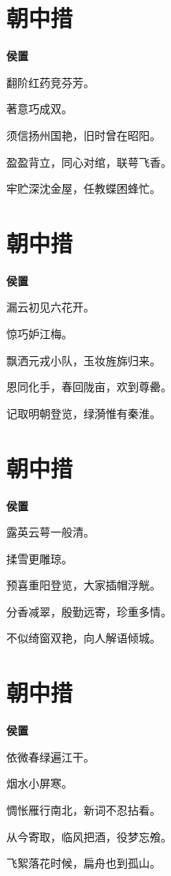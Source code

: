 \documentclass[12pt,a4paper]{ctexbook}
\begin{document}
\section{朝中措}
\textbf{侯置}\par\vspace{0.5em}
翻阶红药竞芬芳。\par
著意巧成双。\par
须信扬州国艳，旧时曾在昭阳。\par
盈盈背立，同心对绾，联萼飞香。\par
牢贮深沈金屋，任教蝶困蜂忙。\par

\section{朝中措}
\textbf{侯置}\par\vspace{0.5em}
漏云初见六花开。\par
惊巧妒江梅。\par
飘洒元戎小队，玉妆旌旆归来。\par
恩同化手，春回陇亩，欢到尊罍。\par
记取明朝登览，绿漪惟有秦淮。\par

\section{朝中措}
\textbf{侯置}\par\vspace{0.5em}
露英云萼一般清。\par
揉雪更雕琼。\par
预喜重阳登览，大家插帽浮觥。\par
分香减翠，殷勤远寄，珍重多情。\par
不似绮窗双艳，向人解语倾城。\par

\section{朝中措}
\textbf{侯置}\par\vspace{0.5em}
依微春绿遍江干。\par
烟水小屏寒。\par
惆怅雁行南北，新词不忍拈看。\par
从今寄取，临风把酒，役梦忘飧。\par
飞絮落花时候，扁舟也到孤山。\par
\end{document}

